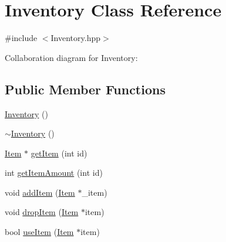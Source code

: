 \hypertarget{classInventory}{\section{Inventory Class Reference}
\label{classInventory}
}


{\ttfamily \#include $<$Inventory.\-hpp$>$}



Collaboration diagram for Inventory\-:
\subsection*{Public Member Functions}
\begin{DoxyCompactItemize}
\item 
\hyperlink{classInventory_a10485613fc8bfb32ee564d9b5110f8fb}{Inventory} ()
\item 
\hyperlink{classInventory_a6c6dfcb6d977c74a7abf46809e892e3d}{$\sim$\-Inventory} ()
\item 
\hyperlink{classItem}{Item} $\ast$ \hyperlink{classInventory_ac2f2ac468bc71956df929d50c225061b}{get\-Item} (int id)
\item 
int \hyperlink{classInventory_a038a62eaa160afe9887d0996e2304286}{get\-Item\-Amount} (int id)
\item 
void \hyperlink{classInventory_aa0b4bf4cff9a961fbcb2df1715bf7f30}{add\-Item} (\hyperlink{classItem}{Item} $\ast$\-\_\-item)
\item 
void \hyperlink{classInventory_a403825da8a0bf8d43dabaf4673e9d0f2}{drop\-Item} (\hyperlink{classItem}{Item} $\ast$item)
\item 
bool \hyperlink{classInventory_a9adc2961b1aea3a9cf86903646d11e65}{use\-Item} (\hyperlink{classItem}{Item} $\ast$item)
\end{DoxyCompactItemize}


